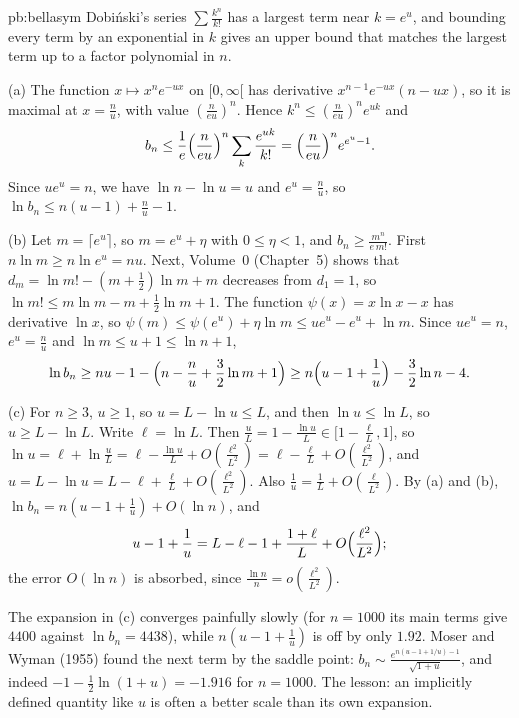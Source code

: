 \begin{solution}{pb:bellasym}
\idea Dobi\'nski's series $\sum\frac{k^n}{k!}$ has a largest term near $k=e^u$, and bounding every term by an exponential in $k$ gives an upper bound that matches the
largest term up to a factor polynomial in $n$.

\writeup (a) The function $x\mapsto x^ne^{-ux}$ on $[0,\infty[$ has derivative $x^{n-1}e^{-ux}(n-ux)$, so it is maximal at $x=\frac nu$, with value $(\frac n{eu})^n$. Hence
$k^n\le(\frac n{eu})^ne^{uk}$ and
\[
b_n\le\frac1e\Bigl(\frac n{eu}\Bigr)^n\sum_k\frac{e^{uk}}{k!}=\Bigl(\frac n{eu}\Bigr)^ne^{e^u-1}.
\]
Since $ue^u=n$, we have $\ln n-\ln u=u$ and $e^u=\frac nu$, so $\ln b_n\le n(u-1)+\frac nu-1$.

(b) Let $m=\lceil e^u\rceil$, so $m=e^u+\eta$ with $0\le\eta<1$, and $b_n\ge\frac{m^n}{e\,m!}$. First $n\ln m\ge n\ln e^u=nu$. Next, Volume~0 (Chapter~5) shows that
$d_m=\ln m!-(m+\frac12)\ln m+m$ decreases from $d_1=1$, so $\ln m!\le m\ln m-m+\frac12\ln m+1$. The function $\psi(x)=x\ln x-x$ has derivative $\ln x$, so
$\psi(m)\le\psi(e^u)+\eta\ln m\le ue^u-e^u+\ln m$. Since $ue^u=n$, $e^u=\frac nu$ and $\ln m\le u+1\le\ln n+1$,
\[
\ln b_n\ge nu-1-\Bigl(n-\frac nu+\frac32\ln m+1\Bigr)\ge n\Bigl(u-1+\frac1u\Bigr)-\frac32\ln n-4.
\]

(c) For $n\ge3$, $u\ge1$, so $u=L-\ln u\le L$, and then $\ln u\le\ln L$, so $u\ge L-\ln L$. Write $\ell=\ln L$. Then $\frac uL=1-\frac{\ln u}L\in\bigl[1-\frac\ell L,1\bigr]$, so
$\ln u=\ell+\ln\frac uL=\ell-\frac{\ln u}L+O(\frac{\ell^2}{L^2})=\ell-\frac\ell L+O(\frac{\ell^2}{L^2})$, and $u=L-\ln u=L-\ell+\frac\ell L+O(\frac{\ell^2}{L^2})$. Also $\frac1u=\frac1L+O(\frac\ell{L^2})$. By (a) and (b),
$\ln b_n=n(u-1+\frac1u)+O(\ln n)$, and
\[
u-1+\frac1u=L-\ell-1+\frac{1+\ell}L+O\Bigl(\frac{\ell^2}{L^2}\Bigr);
\]
the error $O(\ln n)$ is absorbed, since $\frac{\ln n}n=o(\frac{\ell^2}{L^2})$.

\leads The expansion in (c) converges painfully slowly (for $n=1000$ its main terms give $4400$ against $\ln b_n=4438$), while $n(u-1+\frac1u)$ is off by only $1.92$.
Moser and Wyman (1955) found the next term by the saddle point: $b_n\sim\frac{e^{n(u-1+1/u)-1}}{\sqrt{1+u}}$, and indeed $-1-\frac12\ln(1+u)=-1.916$ for $n=1000$. The
lesson: an implicitly defined quantity like $u$ is often a better scale than its own expansion.
\end{solution}

